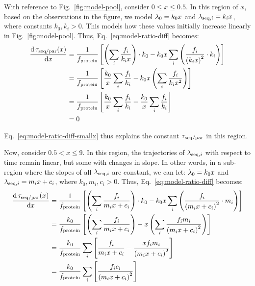 With reference to Fig.\ \ref{fig:model-pool}, consider $0 \leq x \leq 0.5$.
In this region of $x$, based on the observations in the figure, we model $\lambda_{0} = k_{0}x$ and $\lambda_{\mathrm{seq},i} = k_{i}x$, where constants $k_{0}, k_{i} > 0$.
This models how these values initially increase linearly in Fig.\ \ref{fig:model-pool}.
Thus, Eq.\ \ref{eq:model-ratio-diff} becomes:
\begin{equation}
  \begin{aligned}
  \frac{\mathrm{d} \, \tau_{\mathrm{seq}/\mathrm{par}}(x)}{\mathrm{d} x} &= \frac{1}{f_{\mathrm{protein}}} \left[ \left( \sum_i \frac{f_i}{k_{i}x} \right) \cdot k_{0} - k_{0}x \sum_{i}\left( \frac{f_{i}}{{(k_{i}x)}^{2}} \cdot k_{i} \right) \right]\\
  &= \frac{1}{f_{\mathrm{protein}}} \left[ \frac{k_{0}}{x} \sum_i \frac{f_i}{k_{i}} - k_{0}x \left( \sum_{i} \frac{f_{i}}{k_{i}x^{2}} \right) \right]\\
  &= \frac{1}{f_{\mathrm{protein}}} \left[ \frac{k_{0}}{x} \sum_i \frac{f_i}{k_{i}} - \frac{k_{0}}{x} \sum_i \frac{f_i}{k_{i}} \right]\\
  &= 0
  \end{aligned}
  \label{eq:model-ratio-diff-smallx}
\end{equation}

Eq.\ \ref{eq:model-ratio-diff-smallx} thus explains the constant $\tau_{\mathrm{seq}/\mathrm{par}}$ in this region.

Now, consider $0.5 < x \leq 9$.
In this region, the trajectories of $\lambda_{\mathrm{seq},i}$ with respect to time remain linear, but some with changes in slope.
In other words, in a sub-region where the slopes of all $\lambda_{\mathrm{seq},i}$ are constant, we can let: $\lambda_{0} = k_{0}x$ and $\lambda_{\mathrm{seq},i} = m_{i}x + c_{i}$, where $k_{0}, m_{i}, c_{i} > 0$.
Thus, Eq.\ \ref{eq:model-ratio-diff} becomes:
\begin{equation}
  \begin{aligned}
  \frac{\mathrm{d} \, \tau_{\mathrm{seq}/\mathrm{par}}(x)}{\mathrm{d} x} &= \frac{1}{f_{\mathrm{protein}}} \left[ \left( \sum_i \frac{f_i}{m_{i}x+c_{i}} \right) \cdot k_{0} - k_{0}x \sum_{i}\left( \frac{f_{i}}{{(m_{i}x+c_{i})}^{2}} \cdot m_{i} \right) \right]\\
  &= \frac{k_{0}}{f_{\mathrm{protein}}} \left[ \left( \sum_i \frac{f_i}{m_{i}x+c_{i}} \right) - x \left( \sum_{i} \frac{f_{i}m_{i}}{{(m_{i}x+c_{i})}^{2}} \right) \right]\\
  &= \frac{k_{0}}{f_{\mathrm{protein}}} \sum_{i} \left[ \frac{f_i}{m_{i}x+c_{i}} - \frac{xf_{i}m_{i}}{{(m_{i}x+c_{i})}^{2}} \right]\\
  &= \frac{k_{0}}{f_{\mathrm{protein}}} \sum_{i} \left[ \frac{f_{i}c_{i}}{{(m_{i}x+c_{i})}^{2}} \right]
  \end{aligned}
  \label{eq:model-ratio-diff-midx}
\end{equation}

